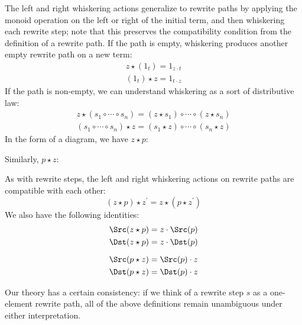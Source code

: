 \documentclass[../generics]{subfiles}
\begin{document}
\begin{definition}
The left and right whiskering actions generalize to rewrite paths by applying the monoid operation on the left or right of the initial term, and then whiskering each rewrite step; note that this preserves the compatibility condition from the definition of a rewrite path. If the path is empty, whiskering produces another empty rewrite path on a new term:
\begin{gather*}
z\star (1_t) = 1_{z\cdot t}\\
(1_t)\star z = 1_{t\cdot z}
\end{gather*}
If the path is non-empty, we can understand whiskering as a sort of distributive law:
\begin{gather*}
z\star (s_1\circ\cdots\circ s_n) = (z\star s_1)\circ\cdots\circ (z\star s_n)\\
(s_1\circ\cdots\circ s_n)\star z = (s_1\star z)\circ\cdots\circ (s_n\star z)
\end{gather*}
In the form of a diagram, we have $z\star p$:
\begin{quote}
\end{quote}
Similarly, $p\star z$:
\begin{quote}
\end{quote}
As with rewrite steps, the left and right whiskering actions on rewrite paths are compatible with each other:
\[(z\star p)\star z^\prime = z\star(p\star z^\prime)\]
We also have the following identities:
\begin{gather*}
\Src(z\star p)=z\cdot\Src(p)\\
\Dst(z\star p)=z\cdot\Dst(p)\\[\medskipamount]
\Src(p\star z)=\Src(p)\cdot z\\
\Dst(p\star z)=\Dst(p)\cdot z
\end{gather*}

Our theory has a certain consistency: if we think of a rewrite step $s$ as a one-element rewrite path, all of the above definitions remain unambiguous under either interpretation.
\end{definition}%
\end{document}
